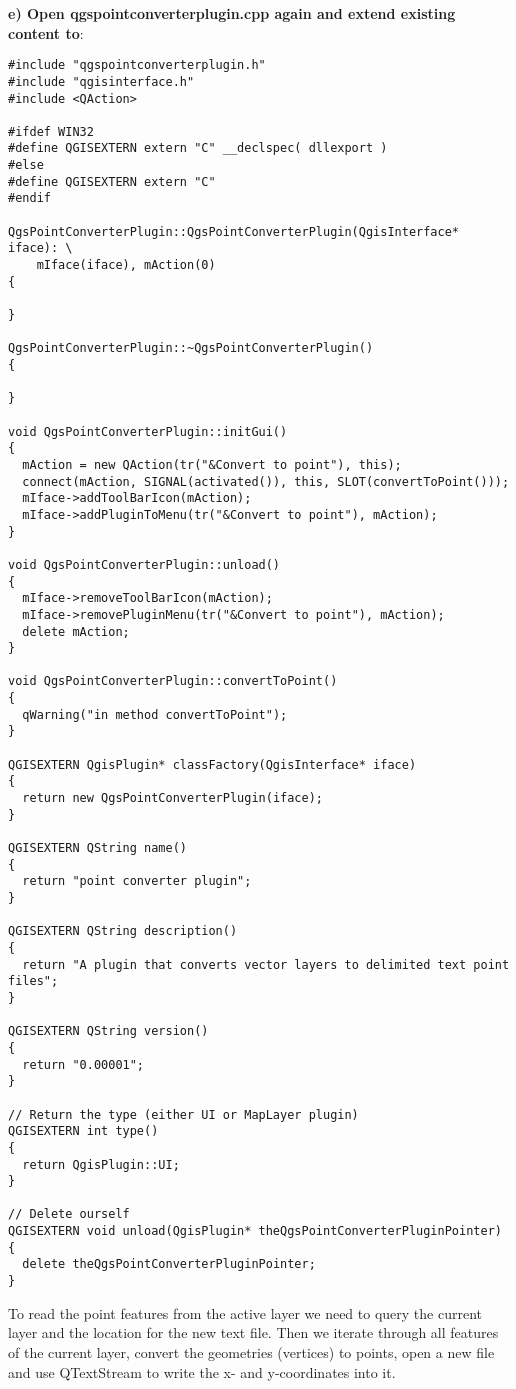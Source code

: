 \textbf{e) Open qgspointconverterplugin.cpp again and extend existing content to}:

\begin{verbatim}
#include "qgspointconverterplugin.h"
#include "qgisinterface.h"
#include <QAction>

#ifdef WIN32
#define QGISEXTERN extern "C" __declspec( dllexport )
#else
#define QGISEXTERN extern "C"
#endif

QgsPointConverterPlugin::QgsPointConverterPlugin(QgisInterface* iface): \
    mIface(iface), mAction(0)
{

}

QgsPointConverterPlugin::~QgsPointConverterPlugin()
{

}

void QgsPointConverterPlugin::initGui()
{
  mAction = new QAction(tr("&Convert to point"), this);
  connect(mAction, SIGNAL(activated()), this, SLOT(convertToPoint()));
  mIface->addToolBarIcon(mAction);
  mIface->addPluginToMenu(tr("&Convert to point"), mAction);
}

void QgsPointConverterPlugin::unload()
{
  mIface->removeToolBarIcon(mAction);
  mIface->removePluginMenu(tr("&Convert to point"), mAction);
  delete mAction;
}

void QgsPointConverterPlugin::convertToPoint()
{
  qWarning("in method convertToPoint");
}

QGISEXTERN QgisPlugin* classFactory(QgisInterface* iface)
{
  return new QgsPointConverterPlugin(iface);
}

QGISEXTERN QString name()
{
  return "point converter plugin";
}

QGISEXTERN QString description()
{
  return "A plugin that converts vector layers to delimited text point files";
}

QGISEXTERN QString version()
{
  return "0.00001";
}

// Return the type (either UI or MapLayer plugin)
QGISEXTERN int type()
{
  return QgisPlugin::UI;
}

// Delete ourself
QGISEXTERN void unload(QgisPlugin* theQgsPointConverterPluginPointer)
{
  delete theQgsPointConverterPluginPointer;
}
\end{verbatim}



To read the point features from the active layer we need to query the current
layer and the location for the new text file. Then we iterate through all
features of the current layer, convert the geometries (vertices) to points,
open a new file and use QTextStream to write the x- and y-coordinates
into it.

